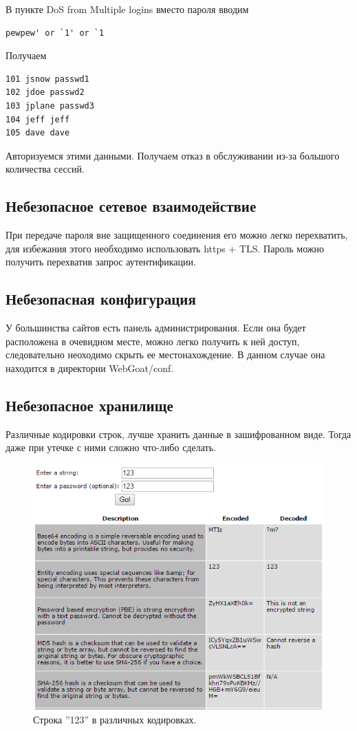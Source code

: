 \documentclass[a4paper, 14pt]{article}				%
\begin{document}
В пункте DoS from Multiple logins вместо пароля вводим
\begin{Verbatim}[frame=single]
pewpew' or `1' or `1
\end{Verbatim}
Получаем
\begin{Verbatim}[frame=single]
101 jsnow passwd1
102 jdoe passwd2
103 jplane passwd3
104 jeff jeff
105 dave dave
\end{Verbatim}
Авторизуемся этими данными. Получаем отказ в обслуживании из-за большого количества сессий.

\subsection{Небезопасное сетевое взаимодействие}
При передаче пароля вне защищенного соединения его можно легко перехватить, для избежания этого необходимо использовать https + TLS. Пароль можно получить перехватив запрос аутентификации.

\subsection{Небезопасная конфигурация}
У большинства сайтов есть панель администрирования. Если она будет расположена в очевидном месте, можно легко получить к ней доступ, следовательно неоходимо скрыть ее местонахождение. В данном случае она находится в директории WebGoat/conf.


\subsection{Небезопасное хранилище}
Различные кодировки строк, лучше хранить данные в зашифрованном виде. Тогда даже при утечке с ними сложно что-либо сделать.
\begin{figure}[h!]
\centering
\includegraphics[width=\textwidth]{rsrc/8_1}
\caption{Строка ''123'' в различных кодировках.}
\end{figure}
\end{document}
